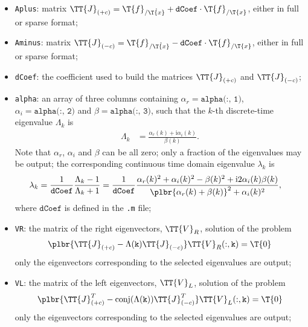 \begin{itemize}
\item \texttt{Aplus}: 
matrix
$\TT{J}_{(+c)} = \T{f}_{/\dot{\T{x}}} + \texttt{dCoef} \cdot \T{f}_{/\T{x}}$,
either in full or sparse format;

\item \texttt{Aminus}: 
matrix
$\TT{J}_{(-c)} = \T{f}_{/\dot{\T{x}}} - \texttt{dCoef} \cdot \T{f}_{/\T{x}}$,
either in full or sparse format;

\item \texttt{dCoef}: the coefficient used to build the matrices
$\TT{J}_{(+c)}$ and $\TT{J}_{(-c)}$;

\item \texttt{alpha}:
an array of three columns containing
$\alpha_r = \texttt{alpha(:, 1)}$,
$\alpha_i = \texttt{alpha(:, 2)}$
and $\beta = \texttt{alpha(:, 3)}$,
such that the $k$-th discrete-time eigenvalue $\Lambda_k$ is
\begin{align}
	\Lambda_k
	&=
	\frac{\alpha_r(k) + \text{i} \alpha_i(k)}{\beta(k)}
	.
\end{align}
Note that $\alpha_r$, $\alpha_i$ and $\beta$ can be all zero;
only a fraction of the eigenvalues may be output;
the corresponding continuous time domain eigenvalue $\lambda_k$ is
\begin{align}
        \label{sec:PROBLEMS:eigenvalues}
	\lambda_k
	&=
	\frac{1}{\texttt{dCoef}}
	\frac{\Lambda_k - 1}{\Lambda_k + 1}
	=
	\frac{1}{\texttt{dCoef}}
	\frac{
		\alpha_r(k)^2
		+
		\alpha_i(k)^2
		-
		\beta(k)^2
		+
		\text{i} 2 \alpha_i(k) \beta(k)
	}{
		\plbr{\alpha_r(k) + \beta(k)}^2 + \alpha_i(k)^2
	}
	,
\end{align}
where $\texttt{dCoef}$ is defined in the \texttt{.m} file;

\item \texttt{VR}: the matrix of the right eigenvectors, $\TT{V}_R$, solution of the problem
\begin{align*}
	\plbr{\TT{J}_{(+c)} - \Lambda(\mathtt{k}) \TT{J}_{(-c)}} \TT{V}_R(:,\mathtt{k}) = \T{0}
\end{align*}
only the eigenvectors corresponding to the selected eigenvalues are output;

\item \texttt{VL}: the matrix of the left eigenvectors, $\TT{V}_L$, solution of the problem
\begin{align*}
	\plbr{\TT{J}_{(+c)}^T - \mathrm{conj}(\Lambda(\mathtt{k})) \TT{J}_{(-c)}^T} \TT{V}_L(:, \mathtt{k}) = \T{0}
\end{align*}
only the eigenvectors corresponding to the selected eigenvalues are output;


\end{itemize}
